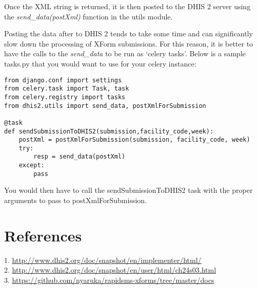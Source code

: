 \documentclass[11pt,a4paper]{article}
\begin{document}
Once the XML string is returned, it is then posted to the DHIS 2 server using the \emph{send\_data(postXml)} function in the utils module.

Posting the data after to DHIS 2 tends to take some time and can significantly slow down the processing  of XForm submissions. For this reason, it is better to have the calls to the \emph{send\_data} to be run as \lq celery tasks'. Below is a sample tasks.py that you would want to use for your celery instance:
\begin{verbatim}
from django.conf import settings
from celery.task import Task, task
from celery.registry import tasks
from dhis2.utils import send_data, postXmlForSubmission

@task
def sendSubmissionToDHIS2(submission,facility_code,week):
    postXml = postXmlForSubmission(submission, facility_code, week)
    try:
        resp = send_data(postXml)
    except:
        pass
\end{verbatim}
You would then have to call the sendSubmissionToDHIS2 task with the proper arguments to pass to postXmlForSubmission.
\pagebreak
\section{References}
1. \url{http://www.dhis2.org/doc/snapshot/en/implementer/html/}\\
2. \url{http://www.dhis2.org/doc/snapshot/en/user/html/ch24s03.html}\\
3. \url{https://github.com/nyaruka/rapidsms-xforms/tree/master/docs}\\
\end{document}
